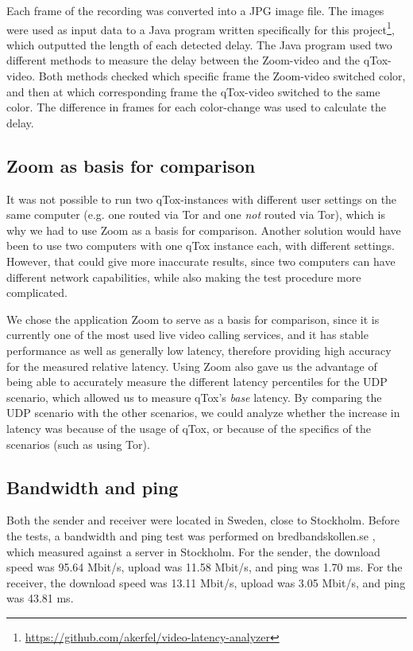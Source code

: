 \documentclass{kththesis}
\begin{document}
Each frame of the recording was converted into a JPG image file. The images were used as input data to a Java program written specifically for this project\footnote{\url{https://github.com/akerfel/video-latency-analyzer}}, which outputted the length of each detected delay. The Java program used two different methods to measure the delay between the Zoom-video and the qTox-video. Both methods checked which specific frame the Zoom-video switched color, and then at which corresponding frame the qTox-video switched to the same color. The difference in frames for each color-change was used to calculate the delay.

\subsection{Zoom as basis for comparison}
It was not possible to run two qTox-instances with different user settings on the same computer (e.g. one routed via Tor and one \emph{not} routed via Tor), which is why we had to use Zoom as a basis for comparison. Another solution would have been to use two computers with one qTox instance each, with different settings. However, that could give more inaccurate results, since two computers can have different network capabilities, while also making the test procedure more complicated.

We chose the application Zoom to serve as a basis for comparison, since it is currently one of the most used live video calling services, and it has stable performance as well as generally low latency, therefore providing high accuracy for the measured relative latency. Using Zoom also gave us the advantage of being able to accurately measure the different latency percentiles for the UDP scenario, which allowed us to measure qTox's \emph{base} latency. By comparing the UDP scenario with the other scenarios, we could analyze whether the increase in latency was because of the usage of qTox, or because of the specifics of the scenarios (such as using Tor).

\subsection{Bandwidth and ping}
Both the sender and receiver were located in Sweden, close to Stockholm. Before the tests, a bandwidth and ping test was performed on bredbandskollen.se \parencite{bredbandskollen}, which measured against a server in Stockholm. For the sender, the download speed was 95.64 Mbit/s, upload was 11.58 Mbit/s, and ping was 1.70 ms. For the receiver, the download speed was 13.11 Mbit/s, upload was 3.05 Mbit/s, and ping was 43.81 ms.
\end{document}
